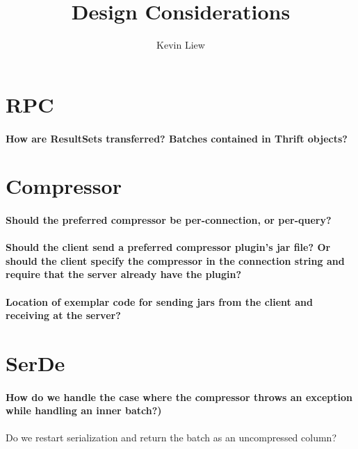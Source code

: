 \documentclass[11pt,a4paper]{article}
\title{Design Considerations}
\author{Kevin Liew}
\begin{document}
\maketitle

\section{RPC}
	\paragraph{How are ResultSets transferred? Batches contained in Thrift objects?} 

\section{Compressor}
	\paragraph{Should the preferred compressor be per-connection, or per-query?}

	\paragraph{Should the client send a preferred compressor plugin's jar file? Or should the client specify the compressor in the connection string and require that the server already have the plugin?}
		
	\paragraph{Location of exemplar code for sending jars from the client and receiving at the server?}

\section{SerDe}
	\paragraph{How do we handle the case where the compressor throws an exception while handling an inner batch?)}
	Do we restart serialization and return the batch as an uncompressed column?
\end{document}
